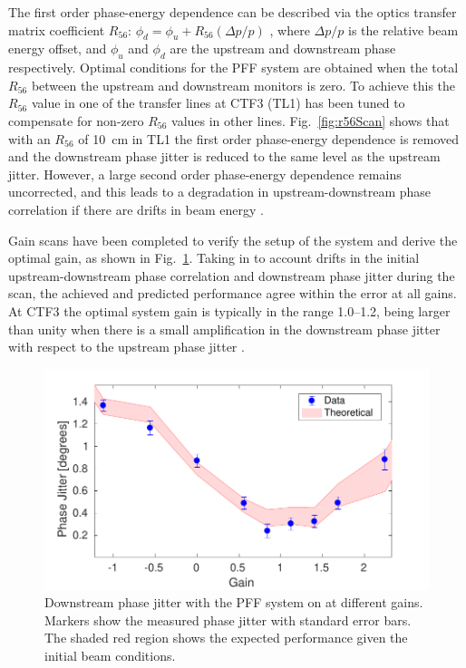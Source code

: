 \documentclass[%
 reprint,
 superscriptaddress,
 amsmath,
 amssymb,
 prl,
]{revtex4-1}
\begin{document}
The first order phase-energy dependence can be described via the optics 
transfer matrix coefficient \(R_{56}\):
\(\phi_d = \phi_u + R_{56}(\Delta p / p)\)
, where \(\Delta p / p\) is the relative beam energy offset, and \(\phi_u\) and 
\(\phi_d\) are the upstream and downstream phase respectively.
Optimal conditions for the PFF system are obtained when the total \(R_{56}\) 
between the upstream and downstream monitors is zero.
To achieve this the \(R_{56}\) value in one of the transfer lines at CTF3 (TL1) 
has been tuned to compensate for non-zero \(R_{56}\) values in other lines.
Fig.~\ref{fig:r56Scan} shows that with an \(R_{56}\) of 10~cm in TL1 the 
first order phase-energy dependence is removed and the 
downstream phase jitter is reduced to the same level as the upstream jitter. 
However, a large second order phase-energy dependence remains uncorrected, and 
this leads to a degradation in upstream-downstream phase correlation if there 
are drifts in beam energy \cite{RobertsThesis}. 

Gain scans have been completed to verify the setup of the system and derive the 
optimal gain, as shown in Fig.~\ref{fig:gScan}. 
Taking in to account drifts in the initial upstream-downstream phase 
correlation and downstream phase jitter during the scan, the achieved and 
predicted performance agree within the error at all gains. 
At CTF3 the optimal system gain is typically in the range 1.0--1.2, 
being larger than unity when there is a small amplification in the downstream 
phase jitter with respect to the upstream phase jitter \cite{RobertsThesis}.

\begin{figure}
\includegraphics[width=\columnwidth]{figs/gScan}
\caption{\label{fig:gScan}Downstream phase jitter with the PFF system on at 
different gains. Markers show the measured phase jitter with standard error 
bars. The shaded red region shows the expected performance given the initial 
beam conditions.}
\end{figure}
\end{document}
